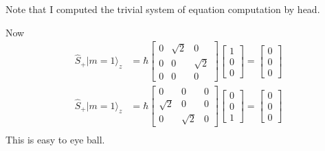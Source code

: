 \documentclass[letter]{article}
\newcommand{\hb}{\hbar}
\begin{document}
Note that I computed the trivial system of equation computation by head. 

Now 
\begin{align*}
	\hat{S}_+ | m = 1 \rangle _z 
	&= 
\hb 
	\begin{bmatrix} 0 & \sqrt{2}  & 0 \\ 0 & 0 & \sqrt{2}  \\ 0 & 0 & 0 \end{bmatrix} 
	\begin{bmatrix} 1 \\ 0 \\ 0 \end{bmatrix}  = \begin{bmatrix} 0\\0\\0 \end{bmatrix} \\ 
	\hat{S}_+ | m = 1 \rangle _z 
	&= 
\hb 
	\begin{bmatrix} 0 & 0  & 0 \\ \sqrt{2}  & 0 & 0  \\ 0 & \sqrt{2}  & 0 \end{bmatrix} 
	\begin{bmatrix} 0 \\ 0 \\ 1 \end{bmatrix}  = \begin{bmatrix} 0\\0\\0 \end{bmatrix} \\ 
\end{align*}
This is easy to eye ball.
\end{document}

